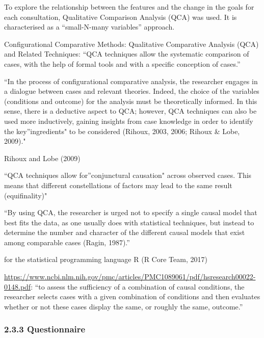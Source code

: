 \documentclass[
  english,
  man]{apa}
\begin{document}
To explore the relationship between the features and the change in the goals for each consultation, Qualitative Comparison Analysis (QCA) was used. It is characterised as a ``small-N-many variables'' approach.

Configurational Comparative Methods: Qualitative Comparative Analysis (QCA) and Related Techniques: ``QCA techniques allow the systematic comparison of cases, with the help of formal tools and with a specific conception of cases.''

``In the process of configurational comparative analysis, the researcher engages in a dialogue between cases and relevant theories. Indeed, the choice of the variables (conditions and outcome) for the analysis must be theoretically informed. In this sense, there is a deductive aspect to QCA; however, QCA techniques can also be used more inductively, gaining insights from case knowledge in order to identify the key''ingredients" to be considered (Rihoux, 2003, 2006; Rihoux \& Lobe, 2009)."

Rihoux and Lobe (2009)

``QCA techniques allow for''conjunctural causation" across observed cases. This means that different constellations of factors may lead to the same result (equifinality)"

``By using QCA, the researcher is urged not to specify a single causal model that best fits the data, as one usually does with statistical techniques, but instead to determine the number and character of the different causal models that exist among comparable cases (Ragin, 1987).''

for the statistical programming language R (R Core Team, 2017)

\url{https://www.ncbi.nlm.nih.gov/pmc/articles/PMC1089061/pdf/hsresearch00022-0148.pdf}: ``to assess the sufficiency of a combination of causal conditions, the researcher selects cases with a given combination of conditions and then evaluates whether or not these cases display the same, or roughly the same, outcome.''

\hypertarget{questionnaire}{%
\subsubsection{2.3.3 Questionnaire}\label{questionnaire}}
\end{document}
